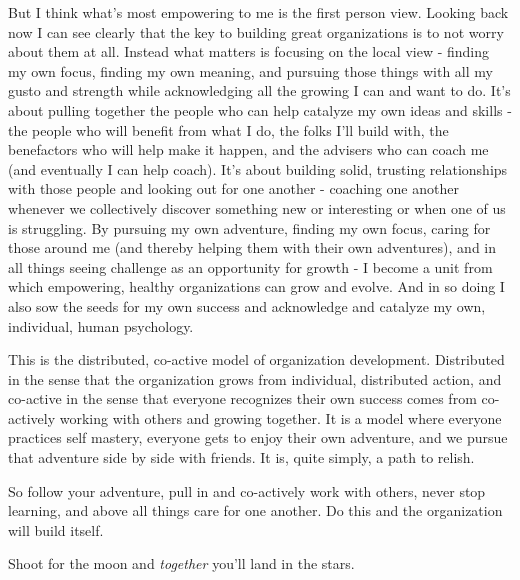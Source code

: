 \documentclass[11pt,a5paper]{book}
\begin{document}
But I think what's most empowering to me is the first person view. Looking back now I can see clearly that the key to building great organizations is to not worry about them at all. Instead what matters is focusing on the local view - finding my own focus, finding my own meaning, and pursuing those things with all my gusto and strength while acknowledging all the growing I can and want to do. It's about pulling together the people who can help catalyze my own ideas and skills - the people who will benefit from what I do, the folks I'll build with, the benefactors who will help make it happen, and the advisers who can coach me (and eventually I can help coach). It's about building solid, trusting relationships with those people and looking out for one another - coaching one another whenever we collectively discover something new or interesting or when one of us is struggling. By pursuing my own adventure, finding my own focus, caring for those around me (and thereby helping them with their own adventures), and in all things seeing challenge as an opportunity for growth - I become a unit from which empowering, healthy organizations can grow and evolve. And in so doing I also sow the seeds for my own success and acknowledge and catalyze my own, individual, human psychology. 
\newline

This is the distributed, co-active model of organization development. Distributed in the sense that the organization grows from individual, distributed action, and co-active in the sense that everyone recognizes their own success comes from co-actively working with others and growing together. It is a model where everyone practices self mastery, everyone gets to enjoy their own adventure, and we pursue that adventure side by side with friends. It is, quite simply, a path to relish.
\newline

So follow your adventure, pull in and co-actively work with others, never stop learning, and above all things care for one another. Do this and the organization will build itself.
\newline

Shoot for the moon and \textit{together} you'll land in the stars.



\end{document}
